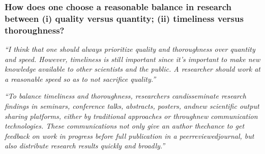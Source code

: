 \documentclass[12pt]{beamer}
\newcommand\ans[1]{{\it ``#1''}}
\newcommand\gap{\vspace{5mm}}
\begin{document}
\begin{frame} %
\frametitle{ How does one choose a reasonable balance in research between (i) quality versus quantity; (ii) timeliness versus thoroughness?}


\ans{I think that one should always prioritize quality and thoroughness over quantity and speed.  However, timeliness is still important since it’s important to make new knowledge available to other scientists and the public.  A researcher should work at a reasonable speed so as to not sacrifice quality.}

\gap

\ans{To balance timeliness and thoroughness, researchers candisseminate  research  findings  in  seminars,  conference  talks,  abstracts,  posters,  andnew scientific output sharing platforms,  either by traditional approaches or throughnew communication technologies.  These communications not only give an author thechance to get feedback on work in progress before full publication in a peerreviewedjournal, but also distribute research results quickly and broadly.}




 


\end{frame}
\end{document}

